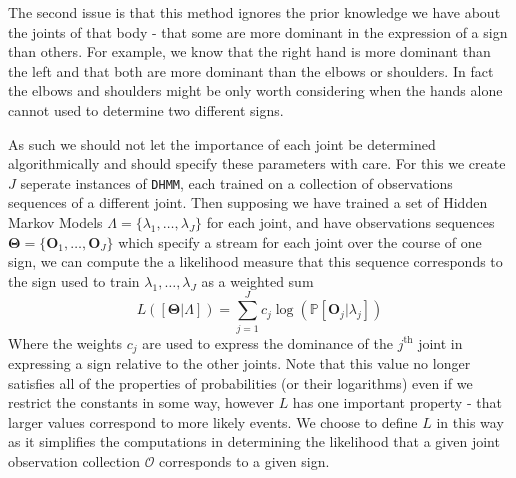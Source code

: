 The second issue is that this method ignores the prior knowledge we have about the joints of that body - that some are more dominant in the expression of a sign than others. For example, we know that the right hand is more dominant than the left and that both are more dominant than the elbows or shoulders. In fact the elbows and shoulders might be only worth considering when the hands alone cannot used to determine two different signs.

As such we should not let the importance of each joint be determined algorithmically and should specify these parameters with care. For this we create $J$ seperate instances of \verb|DHMM|, each trained on a collection of observations sequences of a different joint. Then supposing we have trained a set of Hidden Markov Models $\Lambda = \{\lambda_1, \dots, \lambda_J\}$ for each joint, and have observations sequences $\mathbf{\Theta} = \{\mathbf{O}_1,\dots, \mathbf{O}_J\}$ which specify a stream for each joint over the course of one sign, we can compute the a likelihood measure that this sequence corresponds to the sign used to train $\lambda_1, \dots, \lambda_J$ as a weighted sum
\begin{equation*}
L([\bm{\Theta} | \Lambda ]) = \sum_{j=1}^{J} c_j \log(\mathbb{P}[\mathbf{O}_j | \lambda_j])
\end{equation*}
Where the weights $c_j$ are used to express the dominance of the $j^\text{th}$ joint in expressing a sign relative to the other joints. Note that this value no longer satisfies all of the properties of probabilities (or their logarithms) even if we restrict the constants in some way, however $L$ has one important property - that larger values correspond to more likely events. We choose to define $L$ in this way as it simplifies the computations in determining the likelihood that a given joint observation collection $\mathcal{O}$ corresponds to a given sign.

